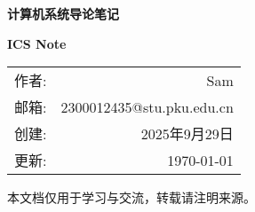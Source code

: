 \providecommand{\CoverTitle}{计算机系统导论笔记}
\providecommand{\CoverSubtitle}{ICS Note}
\providecommand{\CoverAuthor}{Sam}
\providecommand{\CoverEmail}{2300012435@stu.pku.edu.cn}
\providecommand{\CoverDateCreated}{2025年9月29日}

\providecommand{\CoverDisclaimer}{本文档仅用于学习与交流，转载请注明来源。}

\begin{titlepage}
    \thispagestyle{empty}
    \centering
    \vspace*{2cm}

    {\Huge\bfseries\color{black} \CoverTitle\par}
    \vspace{1.0cm}
    {\Large\bfseries\color{gray} \CoverSubtitle\par}

    \vspace{2.5cm}
    \begin{tcolorbox}[
            colback=white,
            colframe=gray!40!white,
            width=0.6\textwidth,
            boxrule=0.5pt,
            sharp corners,
            nobeforeafter,
            coltitle=black,
            left=4mm,
            right=4mm
        ]
        \centering
        \renewcommand{\arraystretch}{1.2}
        \begin{tabular}{lr}
            作者: & \CoverAuthor      \\
            邮箱: & \CoverEmail       \\
            创建: & \CoverDateCreated \\
            更新: & \today            \\
        \end{tabular}
    \end{tcolorbox}

    \vfill
    {\small \CoverDisclaimer\par}
    \vspace{0.6cm}
\end{titlepage}
\newpage


\tableofcontents
\newpage

